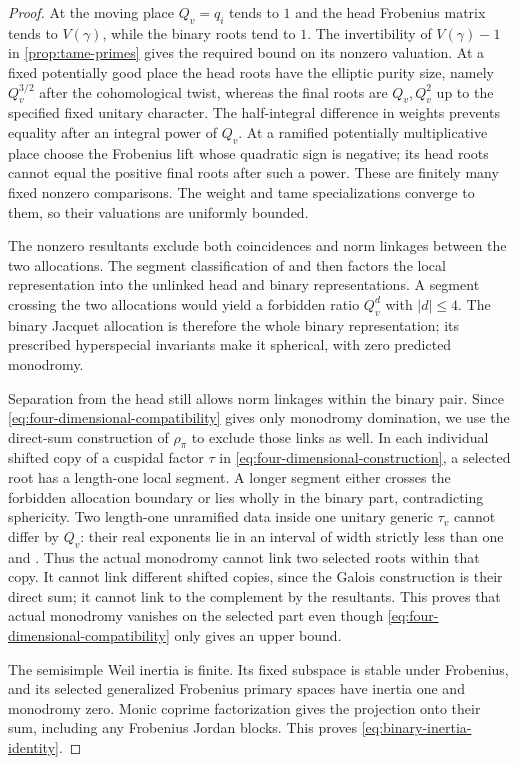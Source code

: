 \begin{proof}
At the moving place $Q_v=q_i$ tends to $1$ and the head Frobenius
matrix tends to $V(\gamma)$, while the binary roots tend to $1$.
The invertibility of $V(\gamma)-1$ in \cref{prop:tame-primes} gives
the required bound on its nonzero valuation.  At a fixed potentially good
place the head roots have the elliptic purity size, namely
$Q_v^{3/2}$ after the cohomological twist, whereas the final roots
are $Q_v,Q_v^2$ up to the specified fixed unitary character.
The half-integral difference in weights prevents equality after an
integral power of $Q_v$.  At a ramified potentially multiplicative
place choose the Frobenius lift whose quadratic sign is negative;
its head roots cannot equal the positive final roots after such a
power.  These are finitely many fixed nonzero comparisons.  The
weight and tame specializations converge to them, so their valuations
are uniformly bounded.

The nonzero resultants exclude both coincidences and norm linkages
between the two allocations.  The segment classification of
\citet{BernsteinZelevinsky1977} and
\citet[Theorem~6.1 and Proposition~8.5]{Zelevinsky1980}
then factors the local
representation into the unlinked head and binary representations.
A segment crossing the two allocations would yield a forbidden ratio
$Q_v^d$ with $|d|\leq4$.  The binary Jacquet allocation is therefore
the whole binary representation; its prescribed hyperspecial
invariants make it spherical, with zero predicted monodromy.

Separation from the head still allows norm linkages within the binary
pair.  Since \cref{eq:four-dimensional-compatibility} gives only
monodromy domination, we use the direct-sum construction of
$\rho_\pi$ to exclude those links as well.  In each individual shifted
copy of a cuspidal factor $\tau$ in
\cref{eq:four-dimensional-construction}, a selected root has a
length-one local segment.  A longer segment either crosses the
forbidden allocation boundary or lies wholly in the binary part,
contradicting sphericity.  Two length-one unramified data inside one
unitary generic $\tau_v$ cannot differ by $Q_v$: their real exponents
lie in an interval of width strictly less than one
\citep[Theorem~7.5]{Tadic1986} and
\citep[Theorem~9.7]{Zelevinsky1980}.  Thus the actual monodromy cannot
link two selected roots within that copy.  It cannot link different shifted copies,
since the Galois construction is their direct sum; it cannot link to
the complement by the resultants.  This proves that actual monodromy
vanishes on the selected part even though
\cref{eq:four-dimensional-compatibility} only gives an upper bound.

The semisimple Weil inertia is finite.  Its fixed subspace is stable
under Frobenius, and its selected generalized Frobenius primary
spaces have inertia one and monodromy zero.  Monic coprime
factorization gives the projection onto their sum, including any
Frobenius Jordan blocks.  This proves
\cref{eq:binary-inertia-identity}.
\end{proof}

